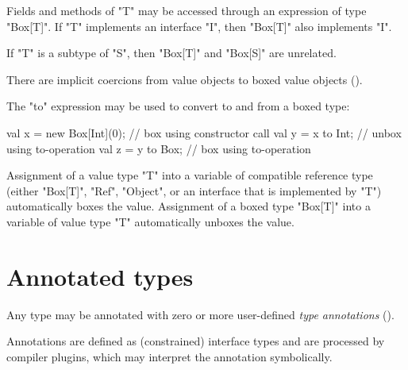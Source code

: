 Fields and methods of \xcd"T" may be accessed through an
expression of type \xcd"Box[T]".
If \xcd"T" implements an interface \xcd"I", then
\xcd"Box[T]" also implements \xcd"I". 

If \xcd"T" is a subtype of \xcd"S", then \xcd"Box[T]" and \xcd"Box[S]"
are unrelated.

There are implicit coercions from value objects to boxed value
objects ().


The \xcd"to" expression may be used to convert to and from a
boxed type:

\begin{xten}
val x = new Box[Int](0); // box using constructor call
val y = x to Int;        // unbox using to-operation
val z = y to Box;        // box using to-operation
\end{xten}

Assignment of a value type \xcd"T" into a variable of compatible reference type
(either \xcd"Box[T]", \xcd"Ref", \xcd"Object", or an interface that is
implemented by \xcd"T")
automatically boxes the value.  Assignment of a boxed type
\xcd"Box[T]" into
a variable of value type \xcd"T" automatically unboxes the value.



\section{Annotated types}
\label{AnnotatedTypes}


        Any \Xten{} type may be annotated with zero or more
        user-defined \emph{type annotations}
        ().  

        Annotations are defined as (constrained) interface types and are
        processed by compiler plugins, which may interpret the
        annotation symbolically.


